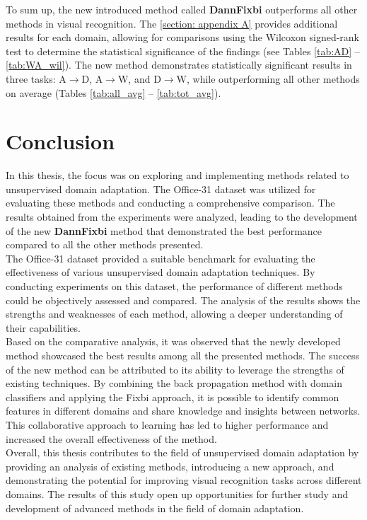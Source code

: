 To sum up, the new introduced method called \textbf{DannFixbi} outperforms all other methods in visual recognition. The \autoref{section: appendix A}  provides additional results for each domain, allowing for comparisons using the Wilcoxon signed-rank test to determine the statistical significance of the findings (see Tables \ref{tab:AD} -- \ref{tab:WA_wil}). The new method demonstrates statistically significant results in three tasks: A$\rightarrow$D, A$\rightarrow$W, and D$\rightarrow$W, while outperforming all other methods on average (Tables \ref{tab:all_avg} -- \ref{tab:tot_avg}).

\newpage
\section{Conclusion}

In this thesis, the focus was on exploring and implementing methods related to unsupervised domain adaptation. The Office-31 dataset was utilized for evaluating these methods and conducting a comprehensive comparison. The results obtained from the experiments were analyzed, leading to the development of the new \textbf{DannFixbi} method that demonstrated the best performance compared to all the other methods presented. \\

The Office-31 dataset provided a suitable benchmark for evaluating the effectiveness of various unsupervised domain adaptation techniques. By conducting experiments on this dataset, the performance of different methods could be objectively assessed and compared. The analysis of the results shows the strengths and weaknesses of each method, allowing a deeper understanding of their capabilities. \\

Based on the comparative analysis, it was observed that the newly developed method showcased the best results among all the presented methods. The success of the new method can be attributed to its ability to leverage the strengths of existing techniques. By combining the back propagation method with domain classifiers and applying the Fixbi approach, it is possible to identify common features in different domains and share knowledge and insights between networks. This collaborative approach to learning has led to higher performance and increased the overall effectiveness of the method.\\

Overall, this thesis contributes to the field of unsupervised domain adaptation by providing an analysis of existing methods, introducing a new approach, and demonstrating the potential for improving visual recognition tasks across different domains. The results of this study open up opportunities for further study and development of advanced methods in the field of domain adaptation.
